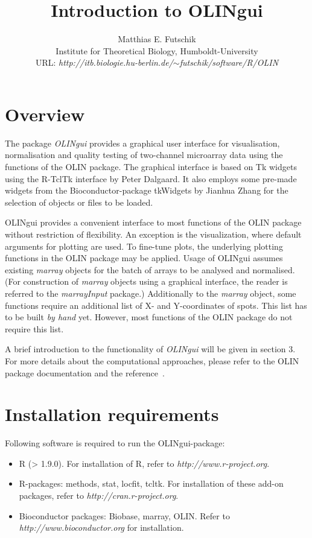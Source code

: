 \documentclass[a4paper,11pt]{article}
\title{Introduction to OLINgui }
\author{Matthias E. Futschik\\ Institute for Theoretical Biology,  Humboldt-University\\ URL: \textit{http://itb.biologie.hu-berlin.de/$\sim$futschik/software/R/OLIN}}
\begin{document}
\maketitle
\tableofcontents

\section{Overview}
The package \emph{OLINgui} provides a graphical user interface for
visualisation, normalisation and quality testing of two-channel microarray data using the  functions of the OLIN package.  
The graphical interface is  based on Tk widgets using the R-TclTk interface by Peter Dalgaard. It also employs
some pre-made widgets from the Bioconductor-package tkWidgets  by Jianhua Zhang for
the selection of objects or files to be loaded. 

OLINgui provides a convenient interface to most functions of the OLIN package without restriction
of flexibility. An exception is the visualization, where default arguments for plotting 
are used. To fine-tune plots, the underlying plotting functions in the OLIN package
may be applied. Usage of OLINgui assumes existing \emph{marray} objects for the batch of arrays to 
be analysed and normalised.  (For construction of \emph{marray} objects using a graphical interface, the reader is referred
 to the \emph{marrayInput} package.) Additionally to the  \emph{marray} object, 
some functions require an additional list of X- and Y-coordinates of spots. 
This list  has to be built \emph{by hand} yet. However, most functions of the OLIN package 
 do not require this list.  

A brief introduction to the  functionality of \emph{OLINgui} will be given in section 3.
For more details about the computational approaches, please refer to the OLIN package documentation
and the reference~\cite{toni}. 


\section{Installation requirements}
Following software is required to run the OLINgui-package:
\begin{itemize} 
\item  R (> 1.9.0). For installation of R, refer to \textit{http://www.r-project.org}.
\item  R-packages: methods, stat, locfit, tcltk. For installation of these add-on packages, refer to \textit{http://cran.r-project.org}.
\item Bioconductor packages: Biobase, marray, OLIN. Refer to \textit{http://www.bioconductor.org} for installation. 
\end{itemize}
\end{document}
